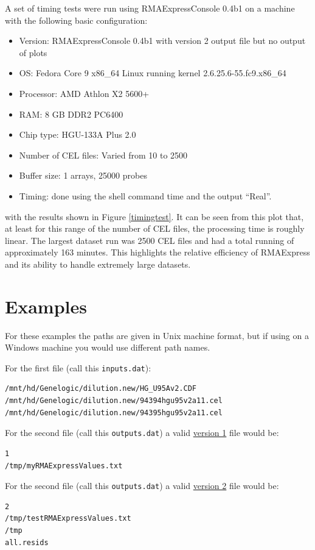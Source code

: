 \documentclass[11pt]{report}
\begin{document}
A set of timing tests were run using RMAExpressConsole 0.4b1 on a machine with the following basic configuration:
\begin{itemize}
\item Version: RMAExpressConsole 0.4b1 with version 2 output file but no output of plots
\item OS: Fedora Core 9 x86\_64 Linux running kernel 2.6.25.6-55.fc9.x86\_64
\item Processor: AMD Athlon X2 5600+ 
\item RAM: 8 GB DDR2 PC6400
\item Chip type: HGU-133A Plus 2.0
\item Number of CEL files: Varied from 10 to 2500
\item Buffer size: 1 arrays, 25000 probes 
\item Timing: done using the shell command time and the output ``Real''.
\end{itemize}
with the results shown in Figure \ref{timingtest}. It can be seen from this plot that, at least for this range of the number of CEL files, the processing time is roughly linear. The largest dataset run was 2500 CEL files and had a total running of approximately 163 minutes. This highlights the relative efficiency of RMAExpress and its ability to handle extremely large datasets.




\section{Examples}

For these examples the paths are given in Unix machine format, but if using on a Windows machine you would use different path names. 

\noindent For the first file (call this {\tt inputs.dat}):
\begin{verbatim}
/mnt/hd/Genelogic/dilution.new/HG_U95Av2.CDF
/mnt/hd/Genelogic/dilution.new/94394hgu95v2a11.cel
/mnt/hd/Genelogic/dilution.new/94395hgu95v2a11.cel
\end{verbatim}

\noindent For the second file (call this {\tt outputs.dat}) a valid \underline{version 1} file would be:
\begin{verbatim}
1
/tmp/myRMAExpressValues.txt
\end{verbatim}

\noindent  For the second file (call this {\tt outputs.dat}) a valid \underline{version 2} file would be:
\begin{verbatim}
2
/tmp/testRMAExpressValues.txt
/tmp
all.resids
\end{verbatim}
\end{document}
